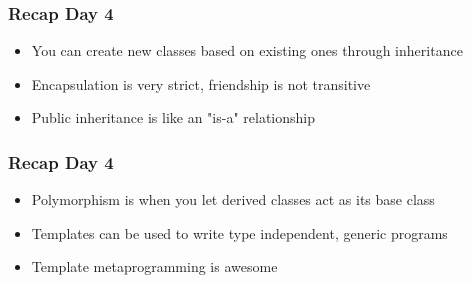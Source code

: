 \documentclass[14pt,a4paper,dvipsnames,usenames]{beamer}
\begin{document}
\frame[plain]{\sectionpage}

\begin{frame}
  \frametitle{Recap Day 4}

  \begin{itemize}
    \setlength\itemsep{0.75em}
    \item You can create new classes based on existing ones through inheritance
    \item Encapsulation is very strict, friendship is not transitive
    \item Public inheritance is like an "is-a" relationship
  \end{itemize}
  
\end{frame}

\begin{frame}
  \frametitle{Recap Day 4}

  \begin{itemize}
    \setlength\itemsep{0.75em}
    \item Polymorphism is when you let derived classes act as its base class
    \item Templates can be used to write type independent, generic programs
    \item Template metaprogramming is awesome
  \end{itemize}
  
\end{frame}
\end{document}
